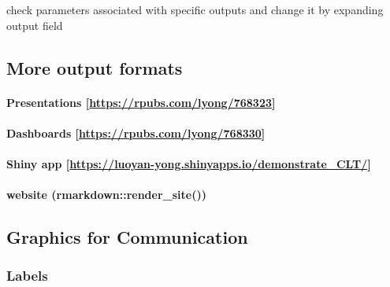 \documentclass[
]{article}
\begin{document}
check parameters associated with specific outputs and change it by
expanding output field

\hypertarget{more-output-formats}{%
\subsection{More output formats}\label{more-output-formats}}

\hypertarget{presentations-httpsrpubs.comlyong768323}{%
\paragraph{\texorpdfstring{Presentations
{[}\url{https://rpubs.com/lyong/768323}{]}}{Presentations {[}https://rpubs.com/lyong/768323{]}}}\label{presentations-httpsrpubs.comlyong768323}}

\hypertarget{dashboards-httpsrpubs.comlyong768330}{%
\paragraph{\texorpdfstring{Dashboards
{[}\url{https://rpubs.com/lyong/768330}{]}}{Dashboards {[}https://rpubs.com/lyong/768330{]}}}\label{dashboards-httpsrpubs.comlyong768330}}

\hypertarget{shiny-app-httpsluoyan-yong.shinyapps.iodemonstrate_clt}{%
\paragraph{\texorpdfstring{Shiny app
{[}\url{https://luoyan-yong.shinyapps.io/demonstrate_CLT/}{]}}{Shiny app {[}https://luoyan-yong.shinyapps.io/demonstrate\_CLT/{]}}}\label{shiny-app-httpsluoyan-yong.shinyapps.iodemonstrate_clt}}

\hypertarget{website-rmarkdownrender_site}{%
\paragraph{website
(rmarkdown::render\_site())}\label{website-rmarkdownrender_site}}

\hypertarget{graphics-for-communication}{%
\subsection{Graphics for
Communication}\label{graphics-for-communication}}

\hypertarget{labels}{%
\subsubsection{Labels}\label{labels}}
\end{document}
